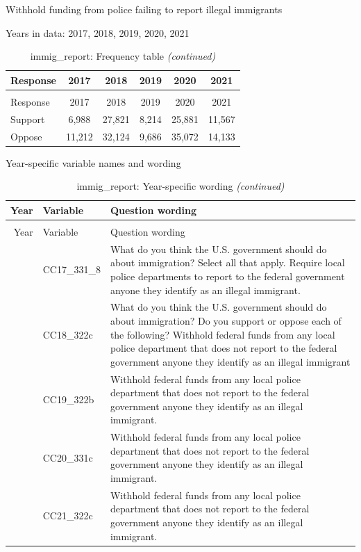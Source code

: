 \documentclass[
  12pt]{article}
\begin{document}
Withhold funding from police failing to report illegal immigrants

Years in data: 2017, 2018, 2019, 2020,
2021\begingroup\fontsize{10}{12}\selectfont

\begin{longtable}[t]{lccccc}
\caption{\label{tab:unnamed-chunk-5}immig\_report: Frequency table}\\
\toprule
Response & 2017 & 2018 & 2019 & 2020 & 2021\\
\midrule
\endfirsthead
\caption[]{immig\_report: Frequency table \textit{(continued)}}\\
\toprule
Response & 2017 & 2018 & 2019 & 2020 & 2021\\
\midrule
\endhead

\endfoot
\bottomrule
\endlastfoot
Support & 6,988 & 27,821 & 8,214 & 25,881 & 11,567\\
Oppose & 11,212 & 32,124 & 9,686 & 35,072 & 14,133\\*
\end{longtable}
\endgroup{}

Year-specific variable names and
wording\begingroup\fontsize{11}{13}\selectfont

\begin{longtable}[t]{rl>{\raggedright\arraybackslash}p{10cm}}
\caption{\label{tab:unnamed-chunk-5}immig\_report: Year-specific wording}\\
\toprule
Year & Variable & Question wording\\
\midrule
\endfirsthead
\caption[]{immig\_report: Year-specific wording \textit{(continued)}}\\
\toprule
Year & Variable & Question wording\\
\midrule
\endhead

\endfoot
\bottomrule
\endlastfoot
2017 & CC17\_331\_8 & What do you think the U.S. government should do about immigration? Select all that apply. Require local police departments to report to the federal government anyone they identify as an illegal immigrant.\\
\addlinespace
2018 & CC18\_322c & What do you think the U.S. government should do about immigration? Do you support or oppose each of the following? Withhold federal funds from any local police department that does not report to the federal government anyone they identify as an illegal immigrant\\
\addlinespace
2019 & CC19\_322b & Withhold federal funds from any local police department that does not report to the federal government anyone they identify as an illegal immigrant.\\
\addlinespace
2020 & CC20\_331c & Withhold federal funds from any local police department that does not report to the federal government anyone they identify as an illegal immigrant.\\
\addlinespace
2021 & CC21\_322c & Withhold federal funds from any local police department that does not report to the federal government anyone they identify as an illegal immigrant.\\*
\end{longtable}
\endgroup{}
\end{document}
